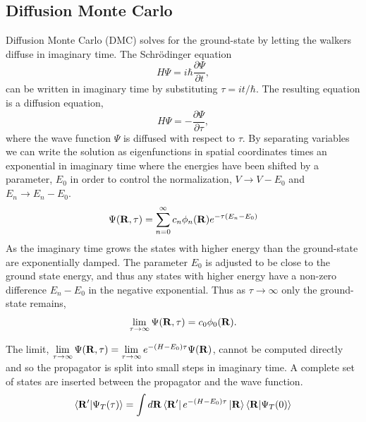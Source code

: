 \subsection{Diffusion Monte Carlo}
Diffusion Monte Carlo (DMC) solves for the ground-state by letting the walkers diffuse in imaginary time. The Schr\"odinger equation
\begin{equation}
   H\Psi = i\hbar\frac{\partial\Psi}{\partial t},
\end{equation}
can be written in imaginary time by substituting $\tau=it/\hbar$. The resulting equation is a diffusion equation,
\begin{equation}
   H\Psi = -\frac{\partial\Psi}{\partial\tau},
   \label{equ:diffusion}
\end{equation}
where the wave function $\Psi$ is diffused with respect to $\tau$. By separating variables we can write the solution as eigenfunctions in spatial coordinates times an exponential in imaginary time where the energies have been shifted by a parameter, $E_0$ in order to control the normalization, $V\rightarrow V - E_0$ and $E_n \rightarrow E_n-E_0$.
\begin{equation}
   \Psi(\mathbf{R},\tau) = \sum\limits_{n=0}^\infty c_n\phi_n(\mathbf{R})e^{-\tau(E_n-E_0)}
\end{equation}
As the imaginary time grows the states with higher energy than the ground-state are exponentially damped. The parameter $E_0$ is adjusted to be close to the ground state energy, and thus any states with higher energy have a non-zero difference $E_n-E_0$ in the negative exponential. Thus as $\tau\rightarrow\infty$ only the ground-state remains,
\begin{equation}
   \lim\limits_{\tau\rightarrow\infty}\Psi(\mathbf{R},\tau) = c_0\phi_0(\mathbf{R}).
\end{equation}

The limit, $\lim\limits_{\tau\rightarrow\infty}\Psi(\mathbf{R},\tau) = \lim\limits_{\tau\rightarrow\infty}e^{-(H-E_0)\tau}\Psi(\mathbf{R})$, cannot be computed directly and so the propagator is split into small steps in imaginary time. A complete set of states are inserted between the propagator and the wave function.
\begin{equation}
   \left< \mathbf{R}' | \Psi_T(\tau) \right> = \int d\mathbf{R} \left< \mathbf{R}' \right|e^{-(H-E_0)\tau}\left| \mathbf{R} \right>\left< \mathbf{R} | \Psi_T(0) \right>
\end{equation}

